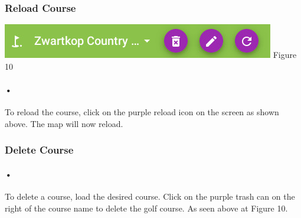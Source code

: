 \documentclass{article}
\begin{document}
	\subsubsection{Reload Course}   
	\includegraphics[scale=1.5]{9_course_controls} 
	Figure 10
	\paragraph{•}
	To reload the course, click on the purple reload icon on the screen as shown above. The map will now reload.
	
    \subsubsection{Delete Course}
	\paragraph{•} 
	To delete a course, load the desired course. Click on the purple trash can on the right of the course name to delete the golf course. As seen above at Figure 10.
\end{document}
